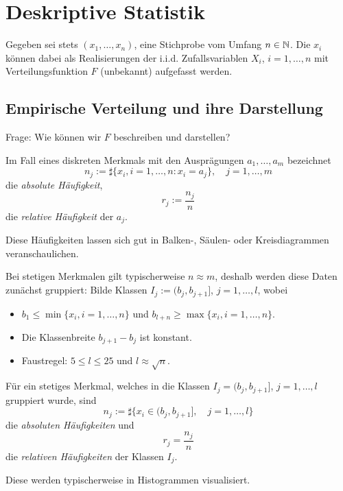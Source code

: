 \chapter{Deskriptive Statistik}
Gegeben sei stets $(x_1, \ldots, x_n)$, eine Stichprobe vom Umfang $n \in \mathbb{N}$.
Die $x_i$ können dabei als Realisierungen der i.i.d. Zufallsvariablen $X_i$, $i
= 1, \ldots, n$ mit Verteilungsfunktion $F$ (unbekannt) aufgefasst werden.

\section{Empirische Verteilung und ihre Darstellung}
Frage: Wie können wir $F$ beschreiben und darstellen?

\begin{defn}
  Im Fall eines diskreten Merkmals mit den Ausprägungen $a_1, \ldots, a_m$
  bezeichnet
  \[ n_j := \sharp \{ x_i, i = 1, \ldots, n : x_i = a_j \}, \quad j =1, \ldots,
    m \]
  die \emph{absolute Häufigkeit},
  \[ r_j := \frac{n_j}{n} \]
  die \emph{relative Häufigkeit}
  der $a_j$.
\end{defn}

Diese Häufigkeiten lassen sich gut in Balken-, Säulen- oder Kreisdiagrammen
veranschaulichen.

Bei stetigen Merkmalen gilt typischerweise $n \approx m$, deshalb werden diese
Daten zunächst gruppiert: Bilde Klassen $I_j := (b_j, b_{j+1}]$, $j = 1, \ldots,
l$, wobei
\begin{itemize}
\item $b_1 \le \min \{ x_i, i = 1, \ldots, n \}$ und $b_{l+n} \ge \max\{x_i, i =
  1, \ldots, n\}$.
\item Die Klassenbreite $b_{j+1}-b_j$ ist konstant.
\item Faustregel: $5 \le l \le 25$ und $l \approx \sqrt{n}$.
\end{itemize}

\addtocounter{thm}{1}
\begin{defn} %
  Für ein stetiges Merkmal, welches in die Klassen $I_j = (b_j, b_{j+1}]$, $j =
  1, \ldots, l$ gruppiert wurde, sind
  \[ n_j := \sharp \{ x_i \in (b_j, b_{j+1} ], \quad j = 1, \ldots, l \} \]
  die \emph{absoluten Häufigkeiten} und
  \[ r_j = \frac{n_j}{n} \]
  die \emph{relativen Häufigkeiten} der Klassen $I_j$.
\end{defn}

Diese werden typischerweise in Histogrammen visualisiert.

